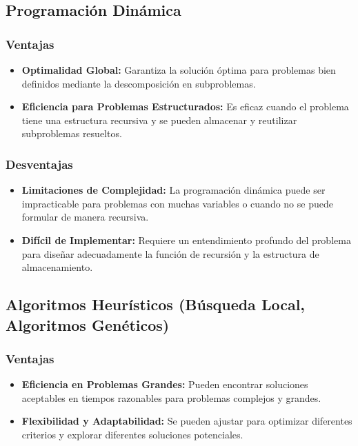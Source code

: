 \documentclass{article}
\begin{document}
\subsection*{Programación Dinámica}

\subsubsection*{Ventajas}
\begin{itemize}
    \item \textbf{Optimalidad Global:} Garantiza la solución óptima para problemas bien definidos mediante la descomposición en subproblemas.
    \item \textbf{Eficiencia para Problemas Estructurados:} Es eficaz cuando el problema tiene una estructura recursiva y se pueden almacenar y reutilizar subproblemas resueltos.
\end{itemize}

\subsubsection*{Desventajas}
\begin{itemize}
    \item \textbf{Limitaciones de Complejidad:} La programación dinámica puede ser impracticable para problemas con muchas variables o cuando no se puede formular de manera recursiva.
    \item \textbf{Difícil de Implementar:} Requiere un entendimiento profundo del problema para diseñar adecuadamente la función de recursión y la estructura de almacenamiento.
\end{itemize}

\subsection*{Algoritmos Heurísticos (Búsqueda Local, Algoritmos Genéticos)}

\subsubsection*{Ventajas}
\begin{itemize}
    \item \textbf{Eficiencia en Problemas Grandes:} Pueden encontrar soluciones aceptables en tiempos razonables para problemas complejos y grandes.
    \item \textbf{Flexibilidad y Adaptabilidad:} Se pueden ajustar para optimizar diferentes criterios y explorar diferentes soluciones potenciales.
\end{itemize}
\end{document}
